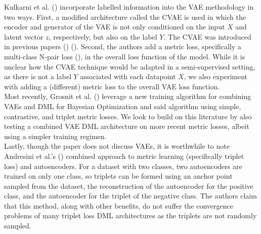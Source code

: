 \documentclass[./dissertation.tex]{subfiles}
\begin{document}
Kulkarni et al. (\citeyear{kulkarni2020deep}) incorporate labelled information into the VAE methodology in two ways. First, a modified architecture called the CVAE is used in which the encoder and generator of the VAE is not only conditioned on the input $X$ and latent vector $z$, respectively, but also on the label $Y$. The CVAE was introduced in previous papers (\cite{sohn2015learning}) (\cite{dahmani2019conditional}). Second, the authors add a metric loss, specifically a multi-class N-pair loss (\cite{sohn2016improved}), in the overall loss function of the model. While it is unclear how the CVAE technique would be adapted in a semi-supervised setting, as there is not a label $Y$ associated with each datapoint $X$, we also experiment with adding a (different) metric loss to the overall VAE loss function. \\
    
Most recently, Grosnit et al. (\citeyear{grosnit2021high}) leverage a new training algorithm for combining VAEs and DML for Bayesian Optimization and said algorithm using simple, contrastive, and triplet metric losses. We look to build on this literature by also testing a combined VAE DML architecture on more recent metric losses, albeit using a simpler training regimen. \\

Lastly, though the paper does not discuss VAEs, it is worthwhile to note Andresini et al.'s (\citeyear{ANDRESINI2021706}) combined approach to metric learning (specifically triplet loss) and autoencoders. For a dataset with two classes, two autoencoders are trained on only one class, so triplets can be formed using an anchor point sampled from the dataset, the reconstruction of the autoencoder for the positive class, and the autoencoder for the triplet of the negative class. The authors claim that this method, along with other benefits, do not suffer the convergence problems of many triplet loss DML architectures as the triplets are not randomly sampled.
\end{document}
